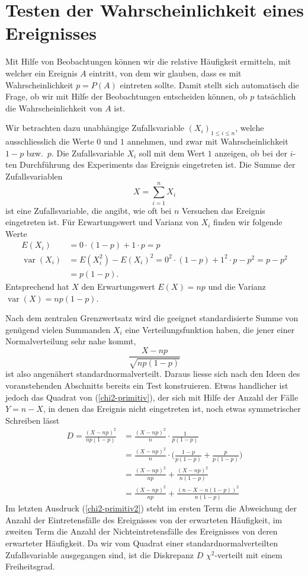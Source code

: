 \section{Testen der Wahrscheinlichkeit eines Ereignisses}
Mit Hilfe von Beobachtungen können wir die relative Häufigkeit ermitteln, mit
welcher ein Ereignis $A$ eintritt, von dem wir glauben, dass es mit
Wahrscheinlichkeit $p=P(A)$ eintreten sollte.
Damit stellt sich automatisch die Frage, ob wir mit Hilfe der
Beobachtungen entscheiden können, ob $p$ tatsächlich die Wahrscheinlichkeit
von $A$ ist.

Wir betrachten dazu unabhängige Zufallsvariable $(X_i)_{1\le i\le n}$,
welche ausschliesslich
die Werte $0$ und $1$ annehmen, und zwar mit Wahrscheinlichkeit
$1-p$ bzw.~$p$.
Die Zufallsvariable $X_i$ soll mit dem Wert $1$ anzeigen,
ob bei der $i$-ten Durchführung des Experiments das Ereignis eingetreten ist.
Die Summe der Zufallsvariablen 
\[
X=\sum_{i=1}^nX_i
\]
ist eine Zufallsvariable, die angibt, wie oft bei $n$ Versuchen das Ereignis
eingetreten ist.
Für Erwartungswert und Varianz von $X_i$ finden
wir folgende Werte
\begin{align*}
E(X_i)
&=
0\cdot (1-p)+1\cdot p=p
\\
\operatorname{var}(X_i)
&=
E(X_i^2)-E(X_i)^2=0^2\cdot (1-p)+1^2\cdot p-p^2 =p-p^2
\\
&=
p(1-p).
\end{align*}
Entsprechend hat $X$ den Erwartungswert $E(X)=np$ und
die Varianz $\operatorname{var}(X)=np(1-p)$.

Nach dem zentralen Grenzwertsatz wird die geeignet standardisierte Summe
von genügend vielen Summanden $X_i$ eine Verteilungsfunktion haben,
die jener einer Normalverteilung sehr nahe kommt, 
\begin{equation}
\frac{X-np}{\sqrt{np(1-p)}}
\label{chi2-primitiv}
\end{equation}
ist also angenähert standardnormalverteilt.
Daraus liesse sich nach den
Ideen des voranstehenden Abschnitts bereits ein Test konstruieren.
Etwas handlicher ist jedoch das Quadrat von (\ref{chi2-primitiv}), der
sich mit Hilfe der Anzahl der Fälle $Y=n-X$, in denen das Ereignis
nicht eingetreten ist, noch etwas symmetrischer Schreiben lässt
\begin{align}
D=\frac{(X-np)^2}{np(1-p)}
&=
\frac{(X-np)^2}{n}\cdot \frac{1}{p(1-p)}\nonumber
\\
&=
\frac{(X-np)^2}{n}\cdot
\biggl(
\frac{1-p}{p(1-p)} +
\frac{p}{p(1-p)}
\biggr)\nonumber
\\
&=
\frac{(X-np)^2}{np}+\frac{(X-np)^2}{n(1-p)}\nonumber
\\
&=
\frac{(X-np)^2}{np}+\frac{(n-X-n(1-p))^2}{n(1-p)}\label{chi2-primitiv2}
\end{align}
Im letzten Ausdruck (\ref{chi2-primitiv2})
steht im ersten Term die Abweichung der
Anzahl der Eintretensfälle des Ereignisses von der erwarteten Häufigkeit,
im zweiten Term die Anzahl der Nichteintretensfälle des Ereignisses
von deren erwarteter Häufigkeit.
Da wir vom Quadrat einer standardnormalverteilten Zufallsvariable ausgegangen
sind, ist die Diskrepanz $D$ $\chi^2$-verteilt mit einem Freiheitsgrad.

